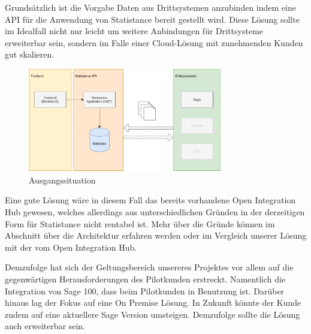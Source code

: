 Grundsätzlich ist die Vorgabe Daten aus Drittsystemen anzubinden indem eine API für die Anwendung von Statistance bereit gestellt wird. Diese Lösung sollte im Idealfall nicht nur leicht um weitere Anbindungen für Drittsysteme erweiterbar sein, sondern im Falle einer Cloud-Lösung mit zunehmenden Kunden gut skalieren.

\begin{figure}[!h]
\centering
\includegraphics[width=8.5cm]{images/0x_requirement_analysis/statistance_ausgangssituation.pdf}
\caption{Ausgangssituation}
\end{figure}

Eine gute Lösung wäre in diesem Fall das bereits vorhandene Open Integration Hub gewesen, welches allerdings aus unterschiedlichen Gründen in der derzeitigen Form für Statistance nicht rentabel ist. Mehr über die Gründe können im Abschnitt über die Architektur erfahren werden oder im Vergleich unserer Lösung mit der vom Open Integration Hub.


Demzufolge hat sich der Geltungsbereich unsereres Projektes vor allem auf die gegenwärtigen Herausforderungen des Pilotkunden erstreckt. Namentlich die Integration von Sage 100, dass beim Pilotkunden in Benutzung ist. Darüber hinaus lag der Fokus auf eine On Premise Lösung. In Zukunft könnte der Kunde zudem auf eine aktuellere Sage Version umsteigen. Demzufolge sollte die Lösung auch erweiterbar sein.